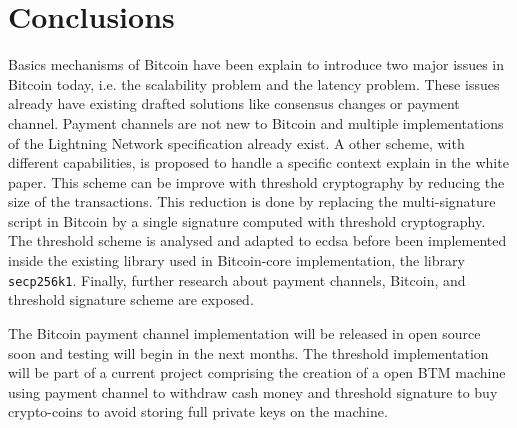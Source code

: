 \chapter{Conclusions}
\label{chap:conclusions}

Basics mechanisms of Bitcoin have been explain to introduce two major issues in
Bitcoin today, i.e. the scalability problem and the latency problem.
These issues already have existing drafted solutions like consensus changes or
payment channel. Payment channels are not new to Bitcoin and multiple implementations
of the Lightning Network specification already exist. A other scheme, with different
capabilities, is proposed to handle a specific context explain in the white paper.
This scheme can be improve with threshold cryptography by reducing the size of
the transactions. This reduction is done by replacing the multi-signature script
in Bitcoin by a single signature computed with threshold cryptography. The
threshold scheme is analysed and adapted to \gls{ecdsa} before been implemented
inside the existing library used in Bitcoin-core implementation, the library
\texttt{secp256k1}. Finally, further research about payment channels, Bitcoin,
and threshold signature scheme are exposed.

The Bitcoin payment channel implementation will be released in open source soon
and testing will begin in the next months. The threshold implementation will be
part of a current project comprising the creation of a open BTM machine using
payment channel to withdraw cash money and threshold signature to buy crypto-coins
to avoid storing full private keys on the machine.
